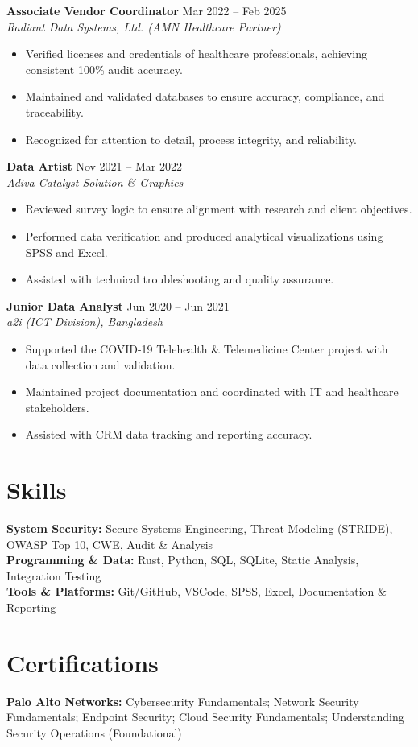 \documentclass[10pt]{article}
\begin{document}
\textbf{Associate Vendor Coordinator} \hfill Mar 2022 -- Feb 2025\\
\textit{Radiant Data Systems, Ltd. (AMN Healthcare Partner)}
\begin{itemize}
  \item Verified licenses and credentials of healthcare professionals, achieving consistent 100\% audit accuracy.
  \item Maintained and validated databases to ensure accuracy, compliance, and traceability.
  \item Recognized for attention to detail, process integrity, and reliability.
\end{itemize}
\vspace{2pt}
\textbf{Data Artist} \hfill Nov 2021 -- Mar 2022\\
\textit{Adiva Catalyst Solution \& Graphics}
\begin{itemize}
  \item Reviewed survey logic to ensure alignment with research and client objectives.
  \item Performed data verification and produced analytical visualizations using SPSS and Excel.
  \item Assisted with technical troubleshooting and quality assurance.
\end{itemize}
\vspace{2pt}
\textbf{Junior Data Analyst} \hfill Jun 2020 -- Jun 2021\\
\textit{a2i (ICT Division), Bangladesh}
\begin{itemize}
  \item Supported the COVID-19 Telehealth \& Telemedicine Center project with data collection and validation.
  \item Maintained project documentation and coordinated with IT and healthcare stakeholders.
  \item Assisted with CRM data tracking and reporting accuracy.
\end{itemize}

\section*{Skills}

\textbf{System Security:} Secure Systems Engineering, Threat Modeling (STRIDE), OWASP Top 10, CWE, Audit \& Analysis\\
\textbf{Programming \& Data:} Rust, Python, SQL, SQLite, Static Analysis, Integration Testing\\
\textbf{Tools \& Platforms:} Git/GitHub, VSCode, SPSS, Excel, Documentation \& Reporting

\section*{Certifications}

\textbf{Palo Alto Networks:} Cybersecurity Fundamentals; Network Security Fundamentals; Endpoint Security; Cloud Security Fundamentals; Understanding Security Operations (Foundational)
\end{document}
